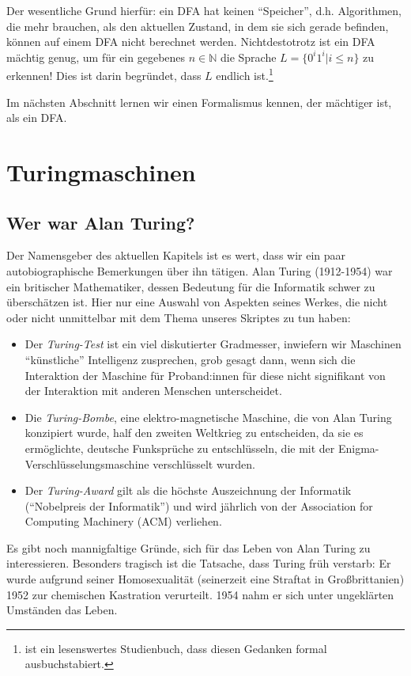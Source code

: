 Der wesentliche Grund hierfür: ein DFA hat keinen ``Speicher'',
d.h. Algorithmen, die mehr brauchen, als den aktuellen Zustand,
in dem sie sich gerade befinden,
können auf einem DFA nicht berechnet werden.
Nichtdestotrotz ist ein DFA mächtig genug,
um für ein gegebenes $n \in \mathbb{N}$ die Sprache
$L = \{0^i1^i| i \leq n\}$ zu erkennen!
Dies ist darin begründet,
dass $L$ endlich ist.\footnote{
    \cite{aul} ist ein lesenswertes Studienbuch, dass diesen Gedanken formal ausbuchstabiert.
}

Im nächsten Abschnitt lernen wir einen Formalismus kennen,
der mächtiger ist, als ein DFA.

\section{Turingmaschinen}
\subsection{Wer war Alan Turing?}
Der Namensgeber des aktuellen Kapitels ist es wert,
dass wir ein paar autobiographische Bemerkungen über ihn tätigen.
Alan Turing (1912-1954) war ein britischer Mathematiker,
dessen Bedeutung für die Informatik schwer zu überschätzen ist.
Hier nur eine Auswahl von Aspekten seines Werkes,
die nicht oder nicht unmittelbar mit dem Thema unseres Skriptes zu tun haben:
\begin{itemize}
    \item Der \emph{Turing-Test} ist ein viel diskutierter Gradmesser,
        inwiefern wir Maschinen ``künstliche'' Intelligenz zusprechen,
        grob gesagt dann, wenn sich die Interaktion der Maschine für Proband:innen
        für diese nicht signifikant von der Interaktion mit anderen Menschen unterscheidet.
    \item Die \emph{Turing-Bombe}, eine elektro-magnetische Maschine,
        die von Alan Turing konzipiert wurde,
        half den zweiten Weltkrieg zu entscheiden,
        da sie es ermöglichte,
        deutsche Funksprüche zu entschlüsseln,
        die mit der Enigma-Verschlüsselungsmaschine verschlüsselt wurden.
    \item Der \emph{Turing-Award} gilt als die höchste Auszeichnung der Informatik
        (``Nobelpreis der Informatik'') und wird jährlich von der
        Association for Computing Machinery (ACM) verliehen.
\end{itemize}
Es gibt noch mannigfaltige Gründe,
sich für das Leben von Alan Turing zu interessieren.
Besonders tragisch ist die Tatsache,
dass Turing früh verstarb:
Er wurde aufgrund seiner Homosexualität (seinerzeit eine Straftat in Großbrittanien)
1952 zur chemischen Kastration verurteilt.
1954 nahm er sich unter ungeklärten Umständen das Leben.

